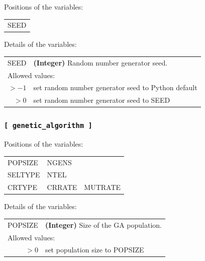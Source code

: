\documentclass[10pt,a4paper,openany]{memoir}
\numberwithin{equation}{section}
\begin{document}
Positions of the variables:
\begin{center}
  \begin{tabular}{l}
    SEED
  \end{tabular}
\end{center}

\noindent Details of the variables:
\vspace{2ex}

{
\begin{tabular}{r@{ : }l}
\label{descr:seed}
      SEED&\textbf{(Integer)} Random number generator seed.                                                                        \\ 
\multicolumn{2}{l}{Allowed values:} \\ 
    \(>-1\)&set random number generator seed to Python default                                                  \\ 
    \(>0\)&set random number generator seed to SEED                                                             \\ 
\end{tabular}
\vspace{1ex}
}

\subsubsection{\texttt{[~genetic\_algorithm~]}}
\label{sec:inp-ga}

Positions of the variables:
\begin{center}
  \begin{tabular}{lll}
    POPSIZE & NGENS & \\
    SELTYPE & NTEL & \\
    CRTYPE & CRRATE & MUTRATE \\
  \end{tabular}
\end{center}

\noindent Details of the variables:
\vspace{2ex}

{
\begin{tabular}{r@{ : }l}
\label{descr:popsize}
   POPSIZE&\textbf{(Integer)} Size of the GA population.                                                                           \\ 
\multicolumn{2}{l}{Allowed values:} \\ 
    \(>0\)&set population size to POPSIZE                                                                       \\ 
\end{tabular}
\vspace{1ex}
}
\end{document}
